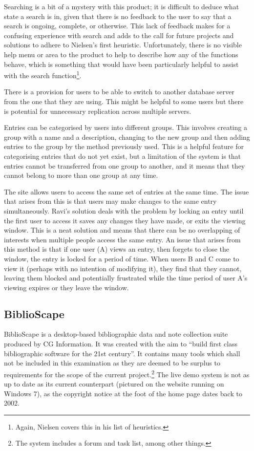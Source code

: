 \documentclass{l4proj}
\begin{document}
Searching is a bit of a mystery with this product; it is difficult to deduce what state a search is in, given that there is no feedback to the user to say that a search is ongoing, complete, or otherwise.  This lack of feedback makes  for a confusing experience with search and adds to the call for future projects and solutions to adhere to Nielsen's first heuristic. Unfortunately, there is no visible help menu or area to the product to help to describe how any of the functions behave, which is something that would have been particularly helpful to assist with the search function\footnote{Again, Nielsen covers this in his list of heuristics.}. 

There is a provision for users to be able to switch to another database server from the one that they are using.  This might be helpful to some users but there is potential for unnecessary replication across multiple servers.  

Entries can be categorised by users into different groups.  This involves creating a group with a name and a description, changing to the new group and then adding entries to the group by the method previously used.  This is a helpful feature for categorising entries that do not yet exist, but a limitation of the system is that entries cannot be transferred from one group to another, and it means that they cannot belong to more than one group at any time.

The site allows users to access the same set of entries at the same time.  The issue that arises from this is that users may make changes to the same entry simultaneously.  Ravi's solution deals with the problem by locking an entry until the first user to access it saves any changes they have made, or exits the viewing window.  This is a neat solution and means that there can be no overlapping of interests when multiple people access the same entry.  An issue that arises from this method is that if one user (A) views an entry, then forgets to close the window, the entry is locked for a period of time.  When users B and C come to view it (perhaps with no intention of modifying it), they find that they cannot, leaving them blocked and potentially frustrated while the time period of user A's viewing expires or they leave the window.

\subsection{BiblioScape}
BiblioScape is a desktop-based bibliographic data and note collection suite produced by CG Information.  It was created with the aim to ``build first class bibliographic software for the 21st century''.  It contains many tools which shall not be included in this examination as they are deemed to be surplus to requirements for the scope of the current project.\footnote{The system includes a forum and task list, among other things.} The live demo system is not as up to date as its current counterpart (pictured on the website running on Windows 7), as the copyright notice at the foot of the home page dates back to 2002.
\end{document}
